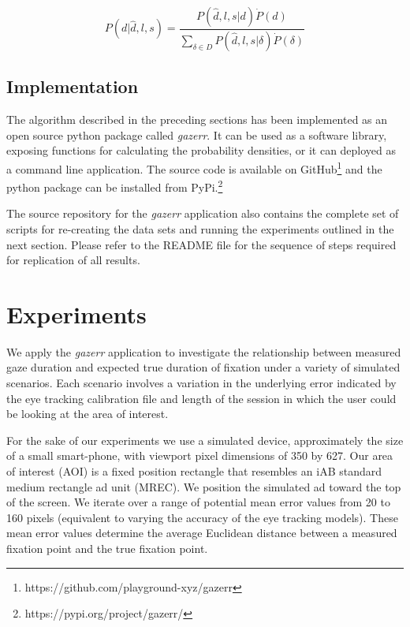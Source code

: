 \documentclass[sigconf]{acmart}
\numberwithin{equation}{section}
\begin{document}
\begin{equation}
\label{eq:p_of_d_full}
P(d|\hat{d},l,s) =  \frac{ P(\hat{d},l,s|d) \dot P(d) }{ \sum_{\delta \in D} P(\hat{d},l,s|\delta) \dot P(\delta)  }
\end{equation}

\subsection{Implementation}

The algorithm described in the preceding sections has been implemented as an open source python 
package called \textit{gazerr}. 
It can be used as a software library, exposing functions for calculating the probability densities,
or it can deployed as a command line application. 
The source code is available on GitHub\footnote{https://github.com/playground-xyz/gazerr}
and the python package can be installed from PyPi.\footnote{https://pypi.org/project/gazerr/}

The source repository for the \textit{gazerr} application also contains the complete
set of scripts for re-creating the data sets and running the experiments outlined in the next 
section. Please refer to the README file for the sequence of steps required for replication
of all results.

\section{Experiments}

We apply the \textit{gazerr} application to investigate the relationship between 
measured gaze duration and expected true duration of fixation under a variety of 
simulated scenarios. 
Each scenario involves a variation in the underlying error indicated by the eye tracking 
calibration file and length of the session in which the user could be looking at 
the area of interest.

For the sake of our experiments we use a simulated device, approximately the size of a
small smart-phone, with viewport pixel dimensions of 350 by 627. 
Our area of interest (AOI) is a fixed position 
rectangle that resembles an iAB standard medium rectangle ad unit (MREC). We position the
simulated ad toward the top of the screen. 
We iterate over a range of potential mean error values from 20 to 160 pixels 
(equivalent to varying the accuracy of the eye tracking models). These mean error
values determine the average Euclidean distance 
between a measured fixation point and the true fixation point.
\end{document}
